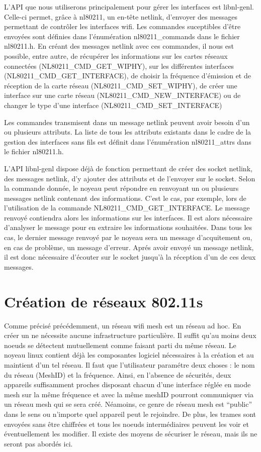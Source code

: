 L'API que nous utiliserons principalement pour gérer les interfaces est libnl-genl. Celle-ci permet, grâce à nl80211, un
en-tête netlink, d'envoyer des messages permettant de contrôler les interfaces wifi. Les commandes suceptibles d'être envoyées
sont définies dans l'énumération nl80211\_\-commands dans le fichier nl80211.h. En créant des messages netlink avec ces commandes,
il nous est possible, entre autre, de récupérer les informations sur les cartes réseaux connectées (NL80211\_\-CMD\_\-GET\_\-WIPHY),
sur les différentes interfaces (NL80211\_\-CMD\_\-GET\_\-INTERFACE), de choisir la fréquence d'émission et de réception de la
carte réseau (NL80211\_\-CMD\_\-SET\_\-WIPHY), de créer une interface sur une carte réseau (NL80211\_\-CMD\_\-NEW\_\-INTERFACE) ou de 
changer le type d'une interface (NL80211\_\-CMD\_\-SET\_\-INTERFACE)


Les commandes transmisent dans un message netlink peuvent avoir besoin d'un ou plusieurs attributs. La liste de tous les 
attributs existants dans le cadre de la gestion des interfaces sans fils est définit dans l'énumération nl80211\_\-attrs dans
le fichier nl80211.h.

L'API libnl-genl dispose déjà de fonction permettant de créer des socket netlink, des messages netlink, d'y ajouter des attributs
et de l'envoyer sur le socket. Selon la commande donnée, le noyeau peut répondre en renvoyant un ou plusieurs messages
netlink contenant des informations. C'est le cas, par exemple, lors de l'utilisation de la commande NL80211\_\-CMD\_\-GET\_\-INTERFACE.
Le message renvoyé contiendra alors les informations sur les interfaces. Il est alors nécessaire d'analyser le message pour 
en extraire les informations souhaitées. Dans tous les cas, le dernier message renvoyé par le noyeau sera un message
d'acquitement ou, en cas de problème, un message d'erreur. Aprés avoir envoyé un message netlink, il est donc nécessaire
d'écouter sur le socket jusqu'à la réception d'un de ces deux messages.

\section{Création de réseaux 802.11s}

Comme précisé précédemment, un réseau wifi mesh est un réseau ad hoc. En créer un ne nécessite aucune infrastructure particulière. 
Il suffit qu'au moins deux noeuds se détectent mutuellement comme faisant parti du même réseau. Le noyeau linux 
contient déjà les composantes logiciel nécessaires à la création et au maintient d'un tel réseau. Il faut que l'utilisateur
paramétre deux choses : le nom du réseau (MeshID) et la fréquence\cite{MNcreate}. Ainsi, en l'absence de sécurités, deux appareils
suffisamment proches disposant chacun d'une interface réglée en mode mesh sur la même fréquence et avec la même meshID pourront
communiquer via un réseau mesh qui se sera créé. Néamoins, ce genre de réseau mesh est ``public'' dans le sens ou n'importe quel
appareil peut le rejoindre. De plus, les trames sont envoyées sans être chiffrées et tous les noeuds intermédiaires peuvent les voir
et éventuellement les modifier. Il existe des moyens de sécuriser le réseau, mais ils ne seront pas abordés ici.

